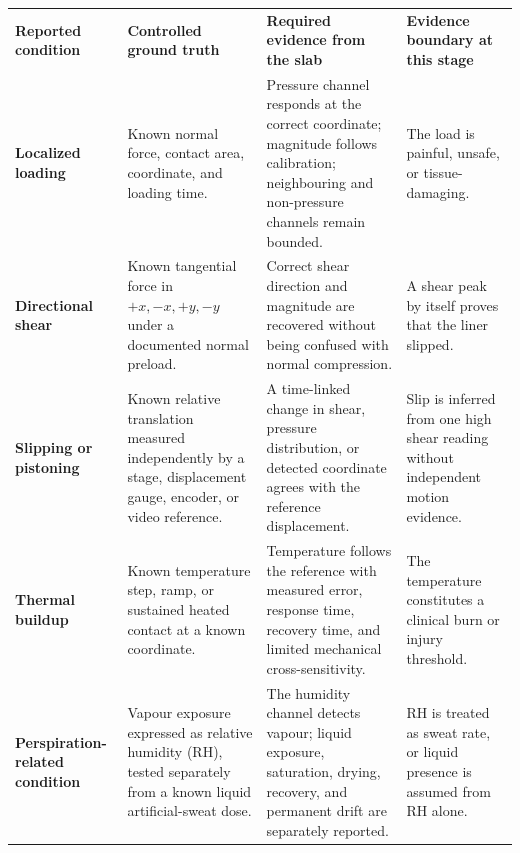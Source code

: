 \hypertarget{q3-operational-definitions}{}

\begingroup
\fontsize{8.55}{10.05}\selectfont
\setlength{\tabcolsep}{3.2pt}
\renewcommand{\arraystretch}{1.14}
\begin{tabularx}{\linewidth}{>{\raggedright\arraybackslash\bfseries\color{AUBRed}}p{2.6cm}
                            >{\raggedright\arraybackslash}p{4.0cm}Y Y}
\color{white}\textbf{Reported condition} &
\color{white}\textbf{Controlled ground truth} &
\color{white}\textbf{Required evidence from the slab} &
\color{white}\textbf{Evidence boundary at this stage} \\
Localized loading & Known normal force, contact area, coordinate, and loading
time. & Pressure channel responds at the correct coordinate; magnitude follows
calibration; neighbouring and non-pressure channels remain bounded. & The load
is painful, unsafe, or tissue-damaging. \\
Directional shear & Known tangential force in $+x,-x,+y,-y$ under a documented
normal preload. & Correct shear direction and magnitude are recovered without
being confused with normal compression. & A shear peak by itself proves that
the liner slipped. \\
Slipping or pistoning & Known relative translation measured independently by a
stage, displacement gauge, encoder, or video reference. & A time-linked change
in shear, pressure distribution, or detected coordinate agrees with the
reference displacement. & Slip is inferred from one high shear reading without
independent motion evidence. \\
Thermal buildup & Known temperature step, ramp, or sustained heated contact at
a known coordinate. & Temperature follows the reference with measured error,
response time, recovery time, and limited mechanical cross-sensitivity. & The
temperature constitutes a clinical burn or injury threshold. \\
Perspiration-related condition & Vapour exposure expressed as relative humidity
(RH), tested separately from a known liquid artificial-sweat dose. & The
humidity channel detects vapour; liquid exposure, saturation, drying, recovery,
and permanent drift are separately reported. & RH is treated as sweat rate, or
liquid presence is assumed from RH alone. \\
\end{tabularx}
\endgroup
{}

